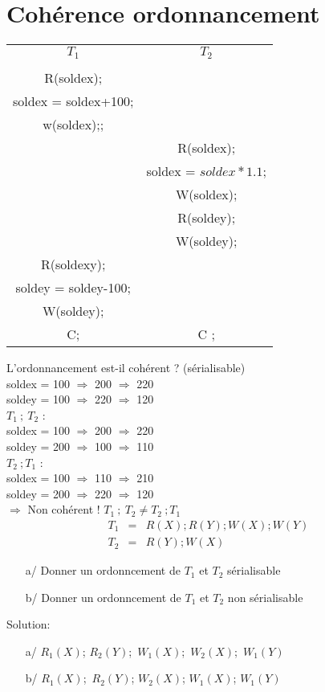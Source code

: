 \documentclass[10pt,a4paper]{article}
\begin{document}
\section*{Cohérence ordonnancement}
\vspace{1cm}
\begin{tabular}{c|c}
$T_1$ & $T_2$\\
&\\
R(soldex); & \\
soldex = soldex+100;&\\
w(soldex);; & \\
\hline
& R(soldex); \\
&soldex = $soldex * 1.1$;\\
&W(soldex);\\
&R(soldey);\\
&W(soldey);\\
\hline
R(soldexy); & \\
soldey = soldey-100; & \\
W(soldey); & \\
C; & C ;
\end{tabular}
\vspace{1cm}

L'ordonnancement est-il cohérent ? (sérialisable) \\
soldex = 100 $\Rightarrow$ 200 $\Rightarrow$ 220\\
soldey = 100 $\Rightarrow$ 220 $\Rightarrow$ 120\\

$T_1\ ;\ T_2$ : \\
soldex = 100 $\Rightarrow$ 200 $\Rightarrow$ 220 \\
soldey = 200 $\Rightarrow$ 100 $\Rightarrow$ 110 \\
$T_2\ ; T_1$ : \\
soldex = 100 $\Rightarrow$ 110 $\Rightarrow$ 210 \\
soldey = 200 $\Rightarrow$ 220 $\Rightarrow$ 120 \\
$\Rightarrow$ Non cohérent ! $T_1\ ;\ T_2 \neq T_2\ ; T_1$  \\
\vspace{1cm}
\begin{eqnarray*}
T_1 &=& R(X); R(Y); W(X) ; W(Y) \\
T_2 &=& R(Y); W(X)
\end{eqnarray*}

\begin{enumerate}
\item[a/] Donner un ordonncement de $T_1$ et $T_2$ sérialisable
\item[b/] Donner un ordonncement de $T_1$ et $T_2$ non sérialisable
\end{enumerate}
Solution: \\
\begin{enumerate}
\item[a/] $R_1(X)$; $R_2(Y)$;\ $W_1(X)$;\ $W_2(X)$;\ $W_1(Y)$
\item[b/] $R_1(X)$;\ $R_2(Y)$; $W_2(X)$; $W_1(X)$; $W_1(Y)$
\end{enumerate}
\end{document}
